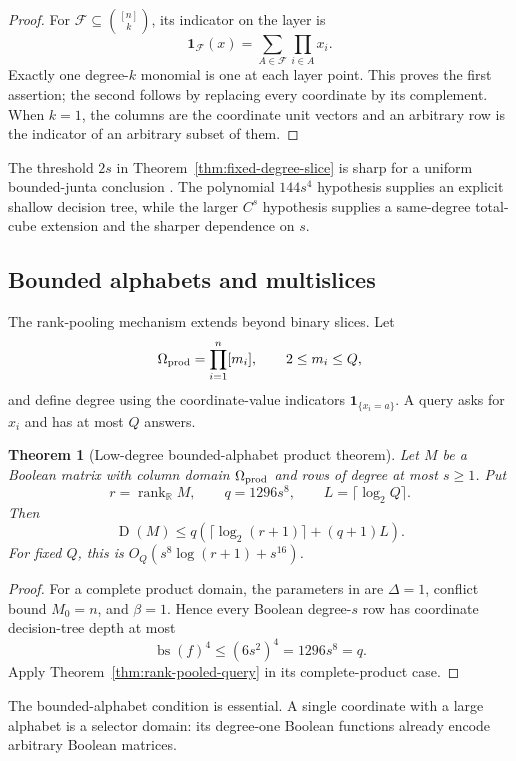 \documentclass[11pt]{article}
\newtheorem{theorem}{Theorem}[section]
\theoremstyle{definition}
\theoremstyle{remark}
\newcommand{\R}{\mathbb R}
\newcommand{\1}{\mathbf 1}
\newcommand{\rank}{\operatorname{rank}}
\newcommand{\Dcc}{\operatorname{D}}
\begin{document}
\begin{proof}
For $\mathcal F\subseteq\binom{[n]}k$, its indicator on the layer is
\[
 \1_{\mathcal F}(x)=
 \sum_{A\in\mathcal F}\prod_{i\in A}x_i.
\]
Exactly one degree-$k$ monomial is one at each layer point.  This proves the
first assertion; the second follows by replacing every coordinate by its
complement.  When $k=1$, the columns are the coordinate unit vectors and an
arbitrary row is the indicator of an arbitrary subset of them.
\end{proof}

The threshold $2s$ in Theorem~\ref{thm:fixed-degree-slice} is sharp for a
uniform bounded-junta conclusion \cite{FilmusJuntaThreshold}.  The polynomial
$144s^4$ hypothesis supplies an explicit shallow decision tree, while the
larger $C^s$ hypothesis supplies a same-degree total-cube extension and the
sharper dependence on $s$.

\subsection{Bounded alphabets and multislices}

The rank-pooling mechanism extends beyond binary slices.  Let
\[
 \Omega_{\rm prod}=\prod_{i=1}^n[m_i],
 \qquad 2\le m_i\le Q,
\]
and define degree using the coordinate-value indicators
$\1_{\{x_i=a\}}$.  A query asks for $x_i$ and has at most $Q$ answers.

\begin{theorem}[Low-degree bounded-alphabet product theorem]
\label{thm:low-degree-product-domain}
Let $M$ be a Boolean matrix with column domain $\Omega_{\rm prod}$ and rows
of degree at most $s\ge1$.  Put
\[
 r=\rank_{\R}M,
 \qquad q=1296s^8,
 \qquad L=\lceil\log_2Q\rceil.
\]
Then
\[
 \Dcc(M)\le
 q\left(\lceil\log_2(r+1)\rceil+(q+1)L\right).
\]
For fixed $Q$, this is
$O_Q(s^8\log(r+1)+s^{16})$.
\end{theorem}

\begin{proof}
For a complete product domain, the parameters in
\cite[Theorem~3.1]{DafniFilmusLifshitzLindzeyVinyals} are
$\Delta=1$, conflict bound $M_0=n$, and $\beta=1$.  Hence every Boolean
degree-$s$ row has coordinate decision-tree depth at most
\[
 \operatorname{bs}(f)^4\le(6s^2)^4=1296s^8=q.
\]
Apply Theorem~\ref{thm:rank-pooled-query} in its complete-product case.
\end{proof}

The bounded-alphabet condition is essential.  A single coordinate with a
large alphabet is a selector domain: its degree-one Boolean functions already
encode arbitrary Boolean matrices.
\end{document}
